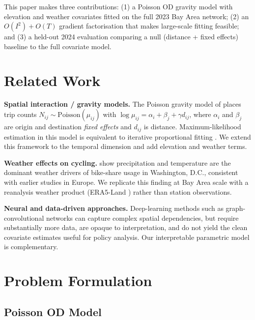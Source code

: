 \documentclass[conference,10pt]{IEEEtran}
\begin{document}
This paper makes three contributions:
(1) a Poisson OD gravity model with elevation and weather covariates
fitted on the full 2023 Bay Area network;
(2) an $O(I^2)+O(T)$ gradient factorisation that makes large-scale
fitting feasible; and
(3) a held-out 2024 evaluation comparing a null (distance + fixed
effects) baseline to the full covariate model.

\section{Related Work}

\textbf{Spatial interaction / gravity models.}
The Poisson gravity model of \citet{Flowerdew1982} places trip counts
$N_{ij}\!\sim\!\text{Poisson}(\mu_{ij})$ with
$\log\mu_{ij} = \alpha_i + \beta_j + \gamma d_{ij}$, where $\alpha_i$
and $\beta_j$ are origin and destination \emph{fixed effects} and
$d_{ij}$ is distance.  Maximum-likelihood estimation in this model is
equivalent to iterative proportional fitting \cite{Fotheringham1989}.
We extend this framework to the temporal dimension and add elevation
and weather terms.

\textbf{Weather effects on cycling.}
\citet{Gebhart2014} show precipitation and temperature are the dominant
weather drivers of bike-share usage in Washington, D.C., consistent with
earlier studies in Europe. We replicate this finding at Bay Area scale
with a reanalysis weather product (ERA5-Land \cite{Munoz2021}) rather
than station observations.

\textbf{Neural and data-driven approaches.}
Deep-learning methods such as graph-convolutional networks
\cite{Bao2017} can capture complex spatial dependencies, but require
substantially more data, are opaque to interpretation, and do not yield
the clean covariate estimates useful for policy analysis. Our
interpretable parametric model is complementary.

\section{Problem Formulation}

\subsection{Poisson OD Model}
\end{document}
